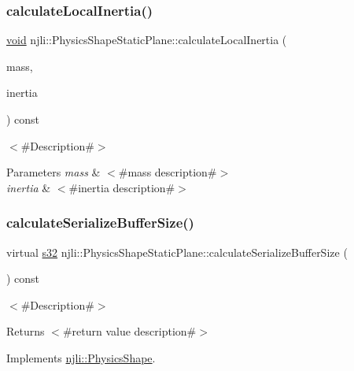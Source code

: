 \subsubsection{\texorpdfstring{calculate\+Local\+Inertia()}{calculateLocalInertia()}}
{\footnotesize\ttfamily \mbox{\hyperlink{_thread_8h_af1e856da2e658414cb2456cb6f7ebc66}{void}} njli\+::\+Physics\+Shape\+Static\+Plane\+::calculate\+Local\+Inertia (\begin{DoxyParamCaption}\item[{bt\+Scalar}]{mass,  }\item[{bt\+Vector3 \&}]{inertia }\end{DoxyParamCaption}) const}

$<$\#\+Description\#$>$


\begin{DoxyParams}{Parameters}
{\em mass} & $<$\#mass description\#$>$ \\
\hline
{\em inertia} & $<$\#inertia description\#$>$ \\
\hline
\end{DoxyParams}
\mbox{\label{classnjli_1_1_physics_shape_static_plane_a43560ce1d910b68d20f602ab1fc03631}} 
\subsubsection{\texorpdfstring{calculate\+Serialize\+Buffer\+Size()}{calculateSerializeBufferSize()}}
{\footnotesize\ttfamily virtual \mbox{\hyperlink{_util_8h_aa62c75d314a0d1f37f79c4b73b2292e2}{s32}} njli\+::\+Physics\+Shape\+Static\+Plane\+::calculate\+Serialize\+Buffer\+Size (\begin{DoxyParamCaption}{ }\end{DoxyParamCaption}) const\hspace{0.3cm}{\ttfamily [virtual]}}

$<$\#\+Description\#$>$

\begin{DoxyReturn}{Returns}
$<$\#return value description\#$>$ 
\end{DoxyReturn}


Implements \mbox{\hyperlink{classnjli_1_1_physics_shape_a0612a1c8c3f4520d78cb7f5838f03074}{njli\+::\+Physics\+Shape}}.

